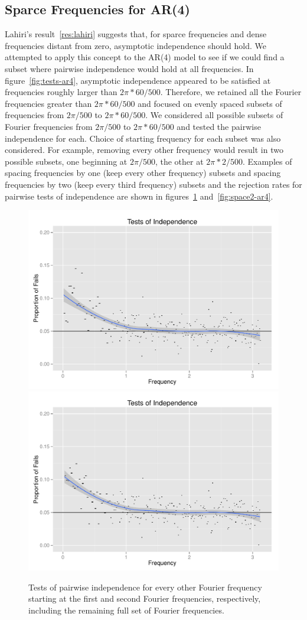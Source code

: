 \documentclass{article}\usepackage{graphicx, color}
\newenvironment{knitrout}{}{} %
\theoremstyle{plain}
\begin{document}
\subsection{Sparce Frequencies for AR(4)} \label{sec:sparce}
Lahiri's result~\ref{res:lahiri} suggests that, for sparce frequencies and dense frequencies distant from zero, asymptotic independence should hold. We attempted to apply this concept to the AR(4) model to see if we could find a subset where pairwise independence would hold at all frequencies. In figure~\ref{fig:tests-ar4}, asymptotic independence appeared to be satisfied at frequencies roughly larger than $2 \pi*60/500$.  Therefore, we retained all the Fourier frequencies greater than $2 \pi*60/500$ and focused on evenly spaced subsets of frequencies from $2\pi/500$ to $2\pi*60/500$. We considered all possible subsets of Fourier frequencies from $2\pi/500$ to $2\pi* 60/500$ and tested the pairwise independence for each. Choice of starting frequency for each subset was also considered. For example, removing every other frequency would result in two possible subsets, one beginning at $2\pi/500$, the other at $2\pi*2/500$. Examples of spacing frequencies by one (keep every other frequency) subsets and spacing frequencies by two (keep every third frequency) subsets and the rejection rates for pairwise tests of independence are shown in figures~\ref{fig:space1-ar4} and~\ref{fig:space2-ar4}.

\begin{knitrout}
\color{fgcolor}\begin{figure}[h]

\includegraphics[width=.49\textwidth]{figure/space1-ar41} 
\includegraphics[width=.49\textwidth]{figure/space1-ar42} \caption[Tests of pairwise independence for every other Fourier frequency starting at the first and second Fourier frequencies, respectively, including the remaining full set of Fourier frequencies]{Tests of pairwise independence for every other Fourier frequency starting at the first and second Fourier frequencies, respectively, including the remaining full set of Fourier frequencies.\label{fig:space1-ar4}}
\end{figure}


\end{knitrout}
\end{document}
